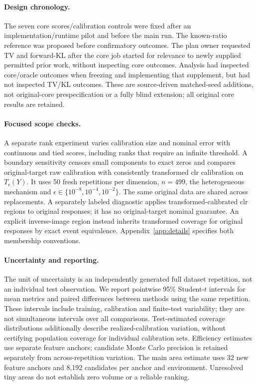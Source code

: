 \paragraph{Design chronology.}
The seven core scores/calibration controls were fixed after an implementation/runtime pilot and before the main run. The known-ratio reference was proposed before confirmatory outcomes. The plan owner requested TV and forward-KL after the core job started for relevance to newly supplied permitted prior work, without inspecting core outcomes. Analysis had inspected core/oracle outcomes when freezing and implementing that supplement, but had not inspected TV/KL outcomes. These are source-driven matched-seed additions, not original-core prespecification or a fully blind extension; all original core results are retained.

\paragraph{Focused scope checks.}
A separate rank experiment varies calibration size and nominal error with continuous and tied scores, including ranks that require an infinite threshold. A boundary sensitivity censors small components to exact zeros and compares original-target raw calibration with consistently transformed clr calibration on $T_\epsilon(Y)$. It uses 50 fresh repetitions per dimension, $n=499$, the heterogeneous mechanism and $\epsilon\in\{10^{-8},10^{-4},10^{-2}\}$. The same original data are shared across replacements. A separately labeled diagnostic applies transformed-calibrated clr regions to original responses; it has no original-target nominal guarantee. An explicit inverse-image region instead inherits transformed coverage for original responses by exact event equivalence. Appendix~\ref{app:details} specifies both membership conventions.

\paragraph{Uncertainty and reporting.}
The unit of uncertainty is an independently generated full dataset repetition, not an individual test observation. We report pointwise 95\% Student-$t$ intervals for mean metrics and paired differences between methods using the same repetition. These intervals include training, calibration and finite-test variability; they are not simultaneous intervals over all comparisons. Test-estimated coverage distributions additionally describe realized-calibration variation, without certifying population coverage for individual calibration sets. Efficiency estimates use separate feature anchors; candidate Monte Carlo precision is retained separately from across-repetition variation. The main area estimate uses 32 new feature anchors and 8,192 candidates per anchor and environment. Unresolved tiny areas do not establish zero volume or a reliable ranking.
